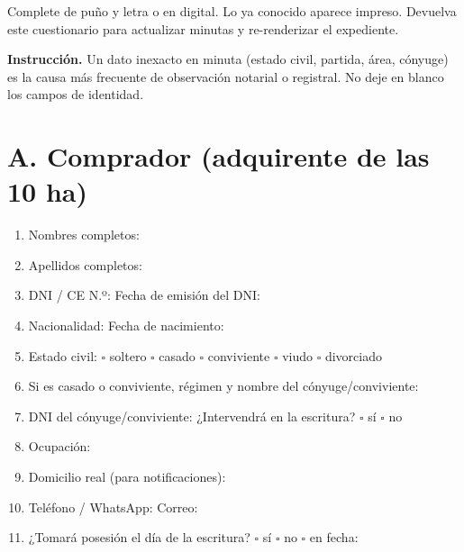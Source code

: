 \documentclass[12pt,a4paper]{article}
\begin{document}


\noindent Complete de puño y letra o en digital. Lo ya conocido aparece impreso. Devuelva este cuestionario para actualizar minutas y re-renderizar el expediente.

\vspace{0.3em}
\noindent\textbf{Instrucción.} Un dato inexacto en minuta (estado civil, partida, área, cónyuge) es la causa más frecuente de observación notarial o registral. No deje en blanco los campos de identidad.

\section*{A. Comprador (adquirente de las 10 ha)}
\begin{enumerate}[leftmargin=1.15cm]
\item Nombres completos: \linea[11.5cm]
\item Apellidos completos: \linea[11.5cm]
\item DNI / CE N.º: \linea[4.5cm] Fecha de emisión del DNI: \linea[3.8cm]
\item Nacionalidad: \linea[4.2cm] Fecha de nacimiento: \linea[4.5cm]
\item Estado civil: \quad $\square$ soltero \quad $\square$ casado \quad $\square$ conviviente \quad $\square$ viudo \quad $\square$ divorciado
\item Si es casado o conviviente, régimen y nombre del cónyuge/conviviente: \linea[8.2cm]
\item DNI del cónyuge/conviviente: \linea[4.5cm] ¿Intervendrá en la escritura? \quad $\square$ sí \quad $\square$ no
\item Ocupación: \linea[11.5cm]
\item Domicilio real (para notificaciones): \linea[10.2cm]
\item Teléfono / WhatsApp: \linea[4.8cm] Correo: \linea[5.8cm]
\item ¿Tomará posesión el día de la escritura? \quad $\square$ sí \quad $\square$ no \quad $\square$ en fecha: \linea[3.5cm]
\end{enumerate}
\end{document}
